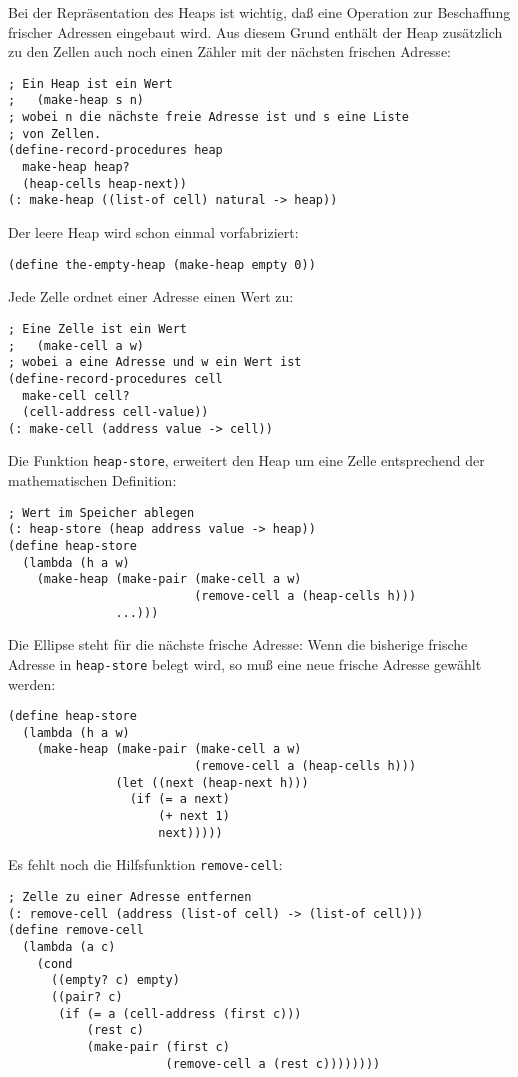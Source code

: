 %
Bei der Repräsentation des Heaps ist wichtig, daß eine Operation zur
Beschaffung frischer Adressen eingebaut wird.  Aus diesem Grund
enthält der Heap zusätzlich zu den Zellen auch noch einen Zähler mit
der nächsten frischen Adresse:
%
\begin{verbatim}
; Ein Heap ist ein Wert
;   (make-heap s n)
; wobei n die nächste freie Adresse ist und s eine Liste
; von Zellen.
(define-record-procedures heap
  make-heap heap?
  (heap-cells heap-next))
(: make-heap ((list-of cell) natural -> heap))
\end{verbatim}
%
Der leere Heap wird schon einmal vorfabriziert:
%
\begin{verbatim}
(define the-empty-heap (make-heap empty 0))
\end{verbatim}
%
Jede Zelle ordnet einer Adresse einen Wert zu:
%
\begin{verbatim}
; Eine Zelle ist ein Wert
;   (make-cell a w)
; wobei a eine Adresse und w ein Wert ist
(define-record-procedures cell
  make-cell cell?
  (cell-address cell-value))
(: make-cell (address value -> cell))
\end{verbatim}
%
Die Funktion \texttt{heap-store}, erweitert den Heap um eine Zelle
entsprechend der mathematischen Definition:
%
\begin{verbatim}
; Wert im Speicher ablegen
(: heap-store (heap address value -> heap))
(define heap-store
  (lambda (h a w)
    (make-heap (make-pair (make-cell a w)
                          (remove-cell a (heap-cells h)))
               ...)))
\end{verbatim}
%
Die Ellipse steht für die nächste frische Adresse: Wenn die bisherige
frische Adresse in \texttt{heap-store} belegt wird, so muß eine neue
frische Adresse gewählt werden:
%
\begin{verbatim}
(define heap-store
  (lambda (h a w)
    (make-heap (make-pair (make-cell a w)
                          (remove-cell a (heap-cells h)))
               (let ((next (heap-next h)))
                 (if (= a next)
                     (+ next 1)
                     next)))))
\end{verbatim}
%
Es fehlt noch die Hilfsfunktion \texttt{remove-cell}:
%
\begin{verbatim}
; Zelle zu einer Adresse entfernen
(: remove-cell (address (list-of cell) -> (list-of cell)))
(define remove-cell
  (lambda (a c)
    (cond
      ((empty? c) empty)
      ((pair? c)
       (if (= a (cell-address (first c)))
           (rest c)
           (make-pair (first c)
                      (remove-cell a (rest c))))))))
\end{verbatim}
